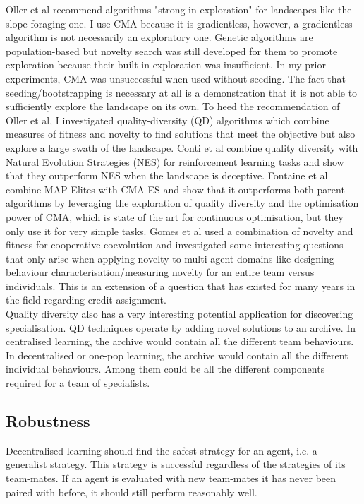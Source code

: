 \documentclass[12pt]{article}
\begin{document}
Oller et al \cite{oller:AAMAS:2020} recommend algorithms "strong in exploration" for landscapes like the slope foraging one.
I use CMA because it is gradientless, however, a gradientless algorithm is not necessarily an exploratory one. 
Genetic algorithms are population-based but novelty search was still developed for them to promote exploration because their built-in exploration was insufficient. 
In my prior experiments, CMA was unsuccessful when used without seeding. 
The fact that seeding/bootstrapping is necessary at all is a demonstration that it is not able to sufficiently explore the landscape on its own.
To heed the recommendation of Oller et al, I investigated quality-diversity (QD) algorithms which combine measures of fitness and novelty to find solutions that meet the objective but also explore a large swath of the landscape.
Conti et al \cite{conti:NeurIPS:2018} combine quality diversity with Natural Evolution Strategies (NES) for reinforcement learning tasks and show that they outperform NES when the landscape is deceptive. 
Fontaine et al \cite{fontaine:GECCO:2020} combine MAP-Elites with CMA-ES and show that it outperforms both parent algorithms by leveraging the exploration of quality diversity and the optimisation power of CMA, which is state of the art for continuous optimisation, but they only use it for very simple tasks. 
Gomes et al \cite{gomes:EC:2017} used a combination of novelty and fitness for cooperative coevolution and investigated some interesting questions that only arise when applying novelty to multi-agent domains like designing behaviour characterisation/measuring novelty for an entire team versus individuals. 
This is an extension of a question that has existed for many years in the field regarding credit assignment.\\

Quality diversity  also has a very interesting potential application for discovering specialisation. 
QD techniques operate by adding novel solutions to an archive. 
In centralised learning, the archive would contain all the different team behaviours. In decentralised or one-pop learning, the archive would contain all the different individual behaviours. 
Among them could be all the different components required for a team of specialists. 

\subsection{Robustness}

Decentralised learning should find the safest strategy for an agent, i.e. a generalist strategy. This strategy is successful regardless of the strategies of its team-mates. If an agent is evaluated with new team-mates it has never been paired with before, it should still perform reasonably well. \\
\end{document}
